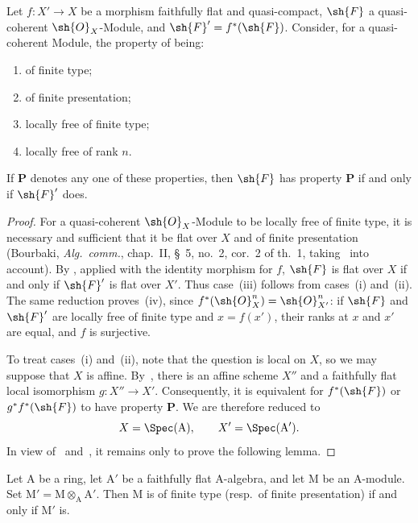 \begin{proposition}[2.5.2]
\label{IV.2.5.2}
Let $f:X'\to X$ be a morphism faithfully flat and quasi-compact,
$\sh{F}$ a quasi-coherent $\sh{O}_X$-Module, and
$\sh{F}'=f^*(\sh{F})$. Consider, for a quasi-coherent Module, the property
of being:
\begin{enumerate}
  \item[(i)] of finite type;
  \item[(ii)] of finite presentation;
  \item[(iii)] locally free of finite type;
  \item[(iv)] locally free of rank $n$.
\end{enumerate}
If $\mathbf{P}$ denotes any one of these properties, then $\sh{F}$ has
property $\mathbf{P}$ if and only if $\sh{F}'$ does.
\end{proposition}

\begin{proof}
For a quasi-coherent $\sh{O}_X$-Module to be locally free of finite type,
it is necessary and sufficient that it be flat over $X$ and of finite
presentation (Bourbaki, \emph{Alg.\ comm.}, chap.~II, \S~5, no.~2,
cor.~2 of th.~1, taking~ into account). By
, applied with the identity morphism for $f$, $\sh{F}$ is
flat over $X$ if and only if $\sh{F}'$ is flat over $X'$. Thus case~(iii)
follows from cases~(i) and~(ii). The same reduction proves~(iv), since
$f^*(\sh{O}_X^n)=\sh{O}_{X'}^n$: if $\sh{F}$ and $\sh{F}'$ are locally
free of finite type and $x=f(x')$, their ranks at $x$ and $x'$ are equal,
and $f$ is surjective.


To treat cases~(i) and~(ii), note that the question is local on $X$, so we
may suppose that $X$ is affine. By~, there is an affine
scheme $X''$ and a faithfully flat local isomorphism $g:X''\to X'$.
Consequently, it is equivalent for $f^*(\sh{F})$ or
$g^*f^*(\sh{F})$ to have property $\mathbf{P}$. We are therefore reduced
to
\[
  X=\Spec(\mathrm{A}),\qquad X'=\Spec(\mathrm{A}').
\]
In view of~ and~, it remains only to
prove the following lemma.
\end{proof}

\begin{lemma}[2.5.3]
\label{IV.2.5.3}
Let $\mathrm{A}$ be a ring, let $\mathrm{A}'$ be a faithfully flat
$\mathrm{A}$-algebra, and let $\mathrm{M}$ be an $\mathrm{A}$-module.
Set $\mathrm{M}'=\mathrm{M}\otimes_{\mathrm{A}}\mathrm{A}'$. Then
$\mathrm{M}$ is of finite type \textnormal{(}resp.\ of finite
presentation\textnormal{)} if and only if $\mathrm{M}'$ is.
\end{lemma}

